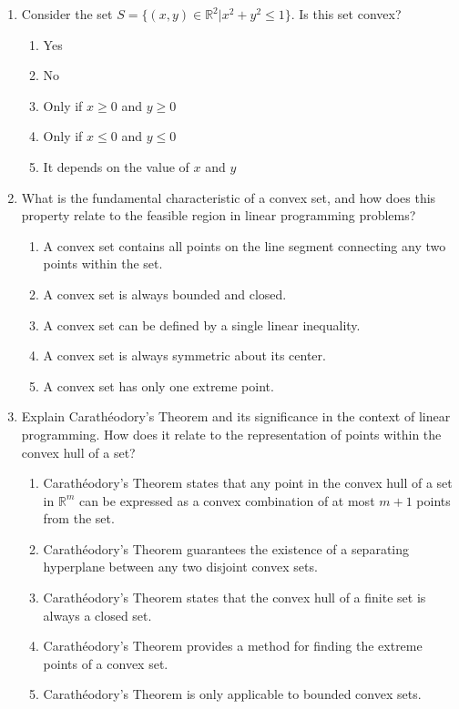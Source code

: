 \documentclass{article}%
\begin{document}
\begin{enumerate}
\item Consider the set $S = \{(x, y) \in \mathbb{R}^2 | x^2 + y^2 \le 1\}$. Is this set convex?%
\begin{enumerate}%
\item Yes%
\item No%
\item Only if $x \ge 0$ and $y \ge 0$%
\item Only if $x \le 0$ and $y \le 0$%
\item It depends on the value of $x$ and $y$%
\end{enumerate}%
\vspace{1em}%
\item What is the fundamental characteristic of a convex set, and how does this property relate to the feasible region in linear programming problems?%
\begin{enumerate}%
\item A convex set contains all points on the line segment connecting any two points within the set.%
\item A convex set is always bounded and closed.%
\item A convex set can be defined by a single linear inequality.%
\item A convex set is always symmetric about its center.%
\item A convex set has only one extreme point.%
\end{enumerate}%
\vspace{1em}%
\item Explain Carathéodory's Theorem and its significance in the context of linear programming.  How does it relate to the representation of points within the convex hull of a set?%
\begin{enumerate}%
\item Carathéodory's Theorem states that any point in the convex hull of a set in $\mathbb{R}^m$ can be expressed as a convex combination of at most $m+1$ points from the set.%
\item Carathéodory's Theorem guarantees the existence of a separating hyperplane between any two disjoint convex sets.%
\item Carathéodory's Theorem states that the convex hull of a finite set is always a closed set.%
\item Carathéodory's Theorem provides a method for finding the extreme points of a convex set.%
\item Carathéodory's Theorem is only applicable to bounded convex sets.%
\end{enumerate}%

\end{enumerate}
\end{document}
